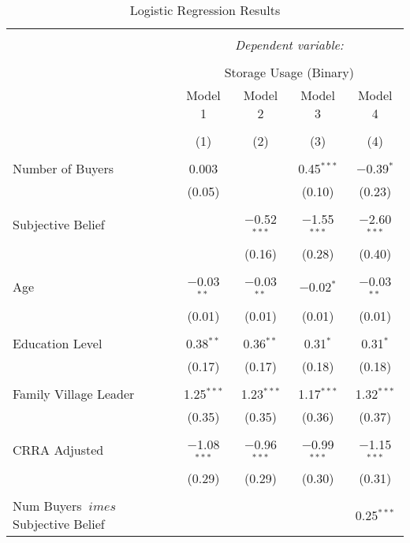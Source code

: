 
\begin{table}[!htbp] \centering 
  \caption{Logistic Regression Results} 
  \label{} 
\footnotesize 
\begin{tabular}{@{\extracolsep{5pt}}lcccc} 
\\[-1.8ex]\hline 
\hline \\[-1.8ex] 
 & \multicolumn{4}{c}{\textit{Dependent variable:}} \\ 
\cline{2-5} 
\\[-1.8ex] & \multicolumn{4}{c}{Storage Usage (Binary)} \\ 
 & Model 1 & Model 2 & Model 3 & Model 4 \\ 
\\[-1.8ex] & (1) & (2) & (3) & (4)\\ 
\hline \\[-1.8ex] 
 Number of Buyers & 0.003 &  & 0.45$^{***}$ & $-$0.39$^{*}$ \\ 
  & (0.05) &  & (0.10) & (0.23) \\ 
  & & & & \\ 
 Subjective Belief &  & $-$0.52$^{***}$ & $-$1.55$^{***}$ & $-$2.60$^{***}$ \\ 
  &  & (0.16) & (0.28) & (0.40) \\ 
  & & & & \\ 
 Age & $-$0.03$^{**}$ & $-$0.03$^{**}$ & $-$0.02$^{*}$ & $-$0.03$^{**}$ \\ 
  & (0.01) & (0.01) & (0.01) & (0.01) \\ 
  & & & & \\ 
 Education Level & 0.38$^{**}$ & 0.36$^{**}$ & 0.31$^{*}$ & 0.31$^{*}$ \\ 
  & (0.17) & (0.17) & (0.18) & (0.18) \\ 
  & & & & \\ 
 Family Village Leader & 1.25$^{***}$ & 1.23$^{***}$ & 1.17$^{***}$ & 1.32$^{***}$ \\ 
  & (0.35) & (0.35) & (0.36) & (0.37) \\ 
  & & & & \\ 
 CRRA Adjusted & $-$1.08$^{***}$ & $-$0.96$^{***}$ & $-$0.99$^{***}$ & $-$1.15$^{***}$ \\ 
  & (0.29) & (0.29) & (0.30) & (0.31) \\ 
  & & & & \\ 
 Num Buyers $\	imes$ Subjective Belief &  &  &  & 0.25$^{***}$ \\ 

\end{tabular}
\end{table}

